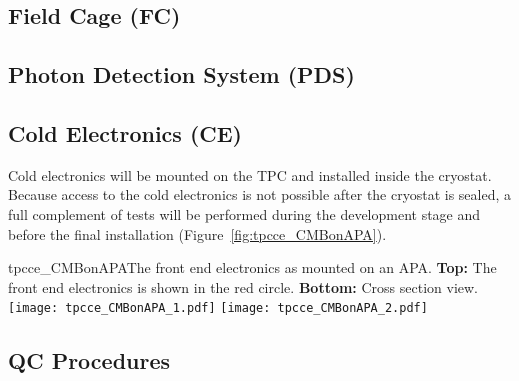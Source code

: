 \subsection{Field Cage (FC)}





\subsection{Photon Detection System (PDS)}



\subsection{Cold Electronics (CE)}
\label{subsec:ce_install}

Cold electronics will be mounted on the TPC and installed inside the cryostat.
Because access to the cold electronics is not possible after the cryostat is sealed,
a full complement of tests will be performed during the development stage and before the final installation
(Figure~\ref{fig:tpcce_CMBonAPA}).

\begin{cdrfigure}{tpcce_CMBonAPA}{The front end electronics as mounted on an APA.
  {\bf Top:} The front end electronics  is shown in the red circle.
  {\bf Bottom:} Cross section view.}
\texttt{[image: tpcce\_CMBonAPA\_1.pdf]}
\texttt{[image: tpcce\_CMBonAPA\_2.pdf]}
\end{cdrfigure}


\subsection{QC Procedures}

